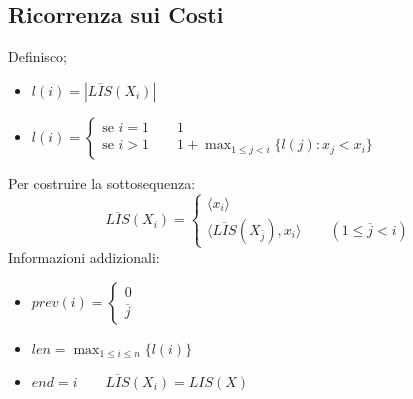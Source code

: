 \subsection{Ricorrenza sui Costi}
Definisco;
\begin{itemize}
    \item $l(i) = |\overline{LIS}(X_i)|$
    \item $l(i) = \begin{cases}
        \text{se } i=1 \qquad 1 \\
        \text{se } i>1 \qquad 1 + \max_{1 \leq j < i}\{l(j): x_j < x_i\}
    \end{cases}$
\end{itemize}
Per costruire la sottosequenza:
\begin{equation*}
    \overline{LIS}(X_i) = 
    \begin{cases}
        \langle x_i \rangle \\
        \langle \overline{LIS}(X_{\overline{j}}),x_i \rangle \qquad (1 \leq \overline{j} < i)
    \end{cases}
\end{equation*}
Informazioni addizionali:
\begin{itemize}
    \item $prev(i) = \begin{cases}
        0 \\
        \overline{j}
    \end{cases}$
    \item $len = \max _{1 \leq i \leq n} \{l(i)\}$
    \item $end = i \qquad \overline{LIS}(X_i) = LIS(X)$
\end{itemize}

